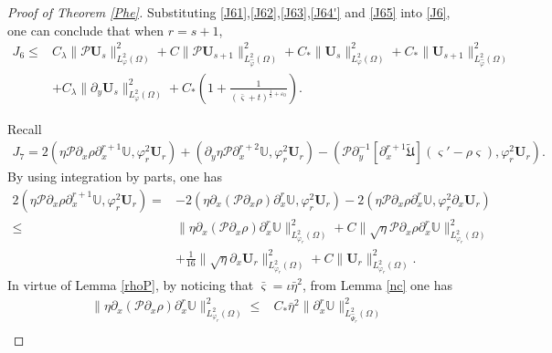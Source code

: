 \documentclass{amsart}
\numberwithin{equation}{section}
\begin{document}
\begin{proof}[Proof of Theorem \ref{Phe}]
Substituting \eqref{J61},\eqref{J62},\eqref{J63},\eqref{J64'} and \eqref{J65} into \eqref{J6}, one can conclude that when $r=s+1$,
\begin{align}\label{J6'}
J_{6}
\leq& C_{\lambda}\|\mathcal{P}\mathbf{U}_{s}\|_{L_{\varphi}^{2}(\Omega)}^{2}
     +C\|\mathcal{P}\mathbf{U}_{s+1}\|_{L_{\hat{\varphi}}^{2}(\Omega)}^{2}
     +C_{*}\|\mathbf{U}_{s}\|_{L_{\varphi}^{2}(\Omega)}^{2}
     +C_{*}\|\mathbf{U}_{s+1}\|_{L_{\hat{\varphi}}^{2}(\Omega)}^{2}\\
    &+C_{\lambda}\|\partial_{y}\mathbf{U}_{s}\|_{L_{\varphi}^{2}(\Omega)}^{2}
     +C_{*}\left(1+\frac{1}{(\bar{\varsigma}+t)^{\frac{1}{2}+\varepsilon_{0}}}\right).\nonumber
\end{align}


Recall
\begin{align}\label{J7}
J_{7}
= 2(\eta\mathcal{P}\partial_{x}\rho\partial_{x}^{r+1}\mathbb{U},\varphi_{r}^{2}\mathbf{U}_{r})
 +(\partial_{y}\eta\mathcal{P}\partial_{x}^{r+2}\mathbb{U},\varphi_{r}^{2}\mathbf{U}_{r})
 -(\mathcal{P}\partial_{y}^{-1}[\partial_{x}^{r+1}\tilde{\mathfrak{U}}](\varsigma'-\rho\varsigma),\varphi_{r}^{2}\mathbf{U}_{r}).
\end{align}
By using integration by parts, one has
\begin{align}\label{J71}
2(\eta\mathcal{P}\partial_{x}\rho\partial_{x}^{r+1}\mathbb{U},\varphi_{r}^{2}\mathbf{U}_{r})
=&-2(\eta\partial_{x}(\mathcal{P}\partial_{x}\rho)\partial_{x}^{r}\mathbb{U},\varphi_{r}^{2}\mathbf{U}_{r})
 -2(\eta\mathcal{P}\partial_{x}\rho\partial_{x}^{r}\mathbb{U},\varphi_{r}^{2}\partial_{x}\mathbf{U}_{r})\\
\leq& \|\eta\partial_{x}(\mathcal{P}\partial_{x}\rho)\partial_{x}^{r}\mathbb{U}\|_{L_{\varphi_{r}}^{2}(\Omega)}^{2}
     +C\|\sqrt{\eta}\mathcal{P}\partial_{x}\rho\partial_{x}^{r}\mathbb{U}\|_{L_{\varphi_{r}}^{2}(\Omega)}^{2}\nonumber\\
    &+\frac{1}{16}\|\sqrt{\eta}\partial_{x}\mathbf{U}_{r}\|_{L_{\varphi_{r}}^{2}(\Omega)}^{2}
     +C\|\mathbf{U}_{r}\|_{L_{\varphi_{r}}^{2}(\Omega)}^{2}.\nonumber
\end{align}
In virtue of Lemma \ref{rhoP}, by noticing that $\bar{\varsigma}=\iota\bar{\eta}^{2}$,
from Lemma \ref{nc} one has
\begin{align}\label{J711}
\|\eta\partial_{x}(\mathcal{P}\partial_{x}\rho)\partial_{x}^{r}\mathbb{U}\|_{L_{\varphi_{r}}^{2}(\Omega)}^{2}
\leq& C_{*}\bar{\eta}^{2}\|\partial_{x}^{r}\mathbb{U}\|_{L_{\hat{\Psi}_{r}}^{2}(\Omega)}^{2}\\

\end{align}
\end{proof}
\end{document}

